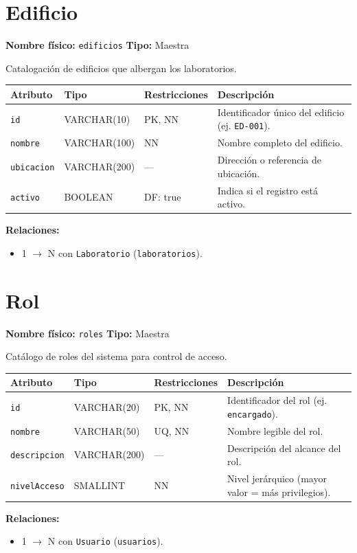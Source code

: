 \documentclass[12pt,a4paper]{article}
\newenvironment{tabladesc}[3]{%
  \section{#1}
  \textbf{Nombre físico:} \texttt{#2} \hfill \textbf{Tipo:} #3\par
  \medskip
}{%
  \bigskip
}
\begin{document}
\begin{tabladesc}{Edificio}{edificios}{Maestra}

Catalogación de edificios que albergan los laboratorios.

\bigskip
\begin{longtable}{L{3.5cm} L{2cm} L{1.8cm} L{8cm}}
\toprule
\textbf{Atributo} & \textbf{Tipo} & \textbf{Restricciones} & \textbf{Descripción} \\
\midrule
\endhead
\bottomrule
\endfoot
\texttt{id}       & VARCHAR(10)  & PK, NN & Identificador único del edificio (ej. \texttt{ED-001}). \\
\texttt{nombre}   & VARCHAR(100) & NN     & Nombre completo del edificio. \\
\texttt{ubicacion} & VARCHAR(200)& ---    & Dirección o referencia de ubicación. \\
\texttt{activo}   & BOOLEAN      & DF: true & Indica si el registro está activo. \\
\bottomrule
\end{longtable}

\textbf{Relaciones:}
\begin{itemize}[nosep]
  \item 1 $\rightarrow$ N con \texttt{Laboratorio} (\texttt{laboratorios}).
\end{itemize}
\end{tabladesc}

\begin{tabladesc}{Rol}{roles}{Maestra}

Catálogo de roles del sistema para control de acceso.

\bigskip
\begin{longtable}{L{3.5cm} L{2cm} L{1.8cm} L{8cm}}
\toprule
\textbf{Atributo} & \textbf{Tipo} & \textbf{Restricciones} & \textbf{Descripción} \\
\midrule
\endhead
\bottomrule
\endfoot
\texttt{id}         & VARCHAR(20)  & PK, NN & Identificador del rol (ej. \texttt{encargado}). \\
\texttt{nombre}     & VARCHAR(50)  & UQ, NN & Nombre legible del rol. \\
\texttt{descripcion}& VARCHAR(200) & ---    & Descripción del alcance del rol. \\
\texttt{nivelAcceso}& SMALLINT     & NN     & Nivel jerárquico (mayor valor = más privilegios). \\
\bottomrule
\end{longtable}

\textbf{Relaciones:}
\begin{itemize}[nosep]
  \item 1 $\rightarrow$ N con \texttt{Usuario} (\texttt{usuarios}).
\end{itemize}
\end{tabladesc}
\end{document}
